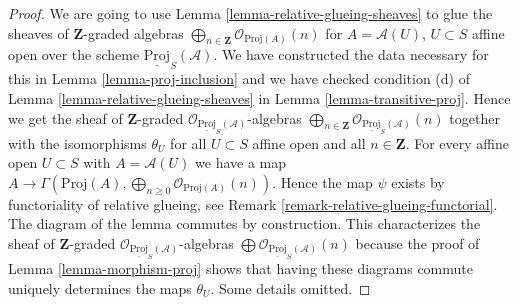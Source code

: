 \begin{proof}
We are going to use Lemma \ref{lemma-relative-glueing-sheaves}
to glue the sheaves of $\mathbf{Z}$-graded algebras
$\bigoplus_{n \in \mathbf{Z}} \mathcal{O}_{\text{Proj}(A)}(n)$
for $A = \mathcal{A}(U)$, $U \subset S$ affine open
over the scheme $\underline{\text{Proj}}_S(\mathcal{A})$.
We have constructed the data necessary for this in
Lemma \ref{lemma-proj-inclusion} and we have checked condition (d) of
Lemma \ref{lemma-relative-glueing-sheaves} in
Lemma \ref{lemma-transitive-proj}. Hence we get the
sheaf of $\mathbf{Z}$-graded
$\mathcal{O}_{\underline{\text{Proj}}_S(\mathcal{A})}$-algebras
$\bigoplus_{n \in \mathbf{Z}}
\mathcal{O}_{\underline{\text{Proj}}_S(\mathcal{A})}(n)$
together with the isomorphisms $\theta_U$ for all
$U \subset S$ affine open and all $n \in \mathbf{Z}$.
For every affine open $U \subset S$ with $A = \mathcal{A}(U)$ we have a map
$A \to \Gamma(\text{Proj}(A),
\bigoplus_{n \geq 0} \mathcal{O}_{\text{Proj}(A)}(n))$.
Hence the map $\psi$ exists by functoriality
of relative glueing, see Remark \ref{remark-relative-glueing-functorial}.
The diagram of the lemma commutes by construction.
This characterizes the sheaf of $\mathbf{Z}$-graded
$\mathcal{O}_{\underline{\text{Proj}}_S(\mathcal{A})}$-algebras
$\bigoplus \mathcal{O}_{\underline{\text{Proj}}_S(\mathcal{A})}(n)$
because the proof of Lemma \ref{lemma-morphism-proj} shows that
having these diagrams commute uniquely determines the maps $\theta_U$.
Some details omitted.
\end{proof}















